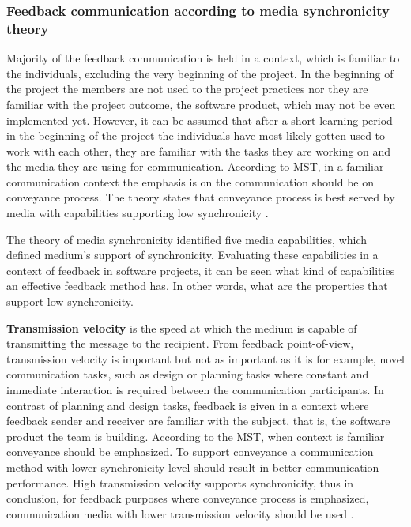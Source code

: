 \documentclass[english,12pt,a4paper,pdftex]{article}
\begin{document}

\subsubsection{Feedback communication according to media synchronicity theory}

Majority of the feedback communication is held in a context, which is familiar to the individuals, excluding the very beginning of the project. In the beginning of the project the members are not used to the project practices nor they are familiar with the project outcome, the software product, which may not be even implemented yet. However, it can be assumed that after a short learning period in the beginning of the project the individuals have most likely gotten used to work with each other, they are familiar with the tasks they are working on and the media they are using for communication. According to \ac{MST}, in a familiar communication context the emphasis is on the communication should be on conveyance process. The theory states that conveyance process is best served by media with capabilities supporting low synchronicity \citep{dennis1999} \citep{dennis2008}.

The theory of media synchronicity identified five media capabilities, which defined medium's support of synchronicity. Evaluating these capabilities in a context of feedback in software projects, it can be seen what kind of capabilities an effective feedback method has. In other words, what are the properties that support low synchronicity.

\textbf{Transmission velocity} is the speed at which the medium is capable of transmitting the message to the recipient. From feedback point-of-view, transmission velocity is important but not as important as it is for example, novel communication tasks, such as design or planning tasks where constant and immediate interaction is required between the communication participants. In contrast of planning and design tasks, feedback is given in a context where feedback sender and receiver are familiar with the subject, that is, the software product the team is building. According to the \ac{MST}, when context is familiar conveyance should be emphasized. To support conveyance a communication method with lower synchronicity level should result in better communication performance. High transmission velocity supports synchronicity, thus in conclusion, for feedback purposes where conveyance process is emphasized, communication media with lower transmission velocity should be used \citep{dennis1999}.
\end{document}

